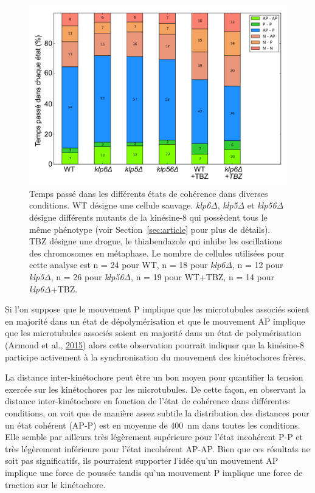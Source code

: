\documentclass[12pt,a4paper,twoside,openright]{book}
\begin{document}
\begin{figure}[htbp]
\centering
\includegraphics{figures/results/imaging/coherence_stats.png}
\caption[Temps passé dans les différents états de cohérence dans différentes conditions]{\label{fig:coherence-stats}Temps
passé dans les différents états de cohérence dans diverses conditions.
WT désigne une cellule sauvage. \emph{klp6Δ}, \emph{klp5Δ} et
\emph{klp56Δ} désigne différents mutants de la kinésine-8 qui possèdent
tous le même phénotype (voir Section~\ref{sec:article} pour plus de
détails). TBZ désigne une drogue, le thiabendazole qui inhibe les
oscillations des chromosomes en métaphase. Le nombre de cellules
utilisées pour cette analyse est n = 24 pour WT, n = 18 pour
\emph{klp6Δ}, n = 12 pour \emph{klp5Δ}, n = 26 pour \emph{klp56Δ}, n =
19 pour WT+TBZ, n = 14 pour \emph{klp6Δ}+TBZ.}
\end{figure}

Si l'on suppose que le mouvement P implique que les microtubules
associés soient en majorité dans un état de dépolymérisation et que le
mouvement AP implique que les microtubules associés soient en majorité
dans un état de polymérisation (Armond et al.,
\protect\hyperlink{ref-Armond2015}{2015}) alors cette observation
pourrait indiquer que la kinésine-8 participe activement à la
synchronisation du mouvement des kinétochores frères.

La distance inter-kinétochore peut être un bon moyen pour quantifier la
tension exercée sur les kinétochores par les microtubules. De cette
façon, en observant la distance inter-kinétochore en fonction de l'état
de cohérence dans différentes conditions, on voit que de manière assez
subtile la distribution des distances pour un état cohérent (AP-P) est
en moyenne de 400~nm dans toutes les conditions. Elle semble par
ailleurs très légèrement supérieure pour l'état incohérent P-P et très
légèrement inférieure pour l'état incohérent AP-AP. Bien que ces
résultats ne soit pas significatifs, ils pourraient supporter l'idée
qu'un mouvement AP implique une force de poussée tandis qu'un mouvement
P implique une force de traction sur le kinétochore.
\end{document}
